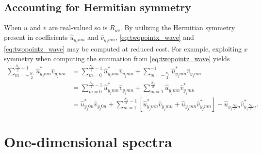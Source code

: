 \documentclass[letterpaper,11pt,nointlimits,reqno]{amsart}
\begin{document}
\subsection{Accounting for Hermitian symmetry}

When $u$ and $v$ are real-valued so is $R_{uv}$.  By utilizing the Hermitian
symmetry present in coefficients $\hat{u}_{y_j m n}$ and $\hat{v}_{y_j m n}$,
\eqref{eq:twopointx_wave} and \eqref{eq:twopointz_wave} may be computed at
reduced cost.  For example, exploiting $x$ symmetry when computing the summation
from \eqref{eq:twopointz_wave} yields
%
\small
\begin{align}
  \sum_{m=-\frac{N_x}{2}}^{\frac{N_x}{2}-1}
  \hat{u}^\ast_{y_j m n} \hat{v}_{y_j m n}
&=
    \sum_{m=0}^{\frac{N_x}{2}-1}
    \hat{u}^\ast_{y_j m n} \hat{v}_{y_j m n}
    +
    \sum_{m=-\frac{N_x}{2}}^{-1}
    \hat{u}^\ast_{y_j m n} \hat{v}_{y_j m n}
\\ &=
    \sum_{m=0}^{\frac{N_x}{2}-1}
    \hat{u}^\ast_{y_j m n} \hat{v}_{y_j m n}
    +
    \sum_{m=1}^{\frac{N_x}{2}}
    \hat{u}_{y_j m n} \hat{v}^\ast_{y_j m n}
\\ &=
    \hat{u}^\ast_{y_j 0 n} \hat{v}_{y_j 0 n}
    +
    \sum_{m=1}^{\frac{N_x}{2}-1}
    \left[
      \hat{u}^\ast_{y_j m n} \hat{v}_{y_j m n}
      +
      \hat{u}_{y_j m n} \hat{v}^\ast_{y_j m n}
    \right]
    +
    \hat{u}_{y_j \frac{N_x}{2} n} \hat{v}^\ast_{y_j \frac{N_x}{2} n}.
\end{align}
\normalsize

\section{One-dimensional spectra
         \citep[\textsection{}6.5]{Pope2000Turbulent}}
\end{document}
